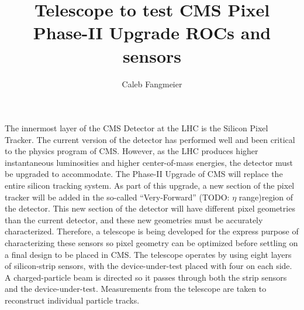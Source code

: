 \documentclass[final]{beamer}
\title{Telescope to test CMS Pixel Phase-II Upgrade ROCs and sensors} %
\author{Caleb Fangmeier} %
\institute{Dept.\ of Physics and Astronomy, Univ.\ of Nebraska \-- Lincoln} %
\begin{document}

\setlength{\belowcaptionskip}{2ex} %
\setlength\belowdisplayshortskip{2ex} %

\begin{frame}[t] %
  \small
  The innermost layer of the CMS Detector at the LHC is the Silicon Pixel Tracker. The current version of the detector has performed well and been critical to the physics program of CMS\@.  However, as the LHC produces higher instantaneous luminosities and higher center-of-mass energies, the detector must be upgraded to accommodate. The Phase-II Upgrade of CMS will replace the entire silicon tracking system.  As part of this upgrade, a new section of the pixel tracker will be added in the so-called ``Very-Forward'' (TODO: $\eta$ range)region of the detector.  This new section of the detector will have different pixel geometries than the current detector, and these new geometries must be accurately characterized.  Therefore, a telescope is being developed for the express purpose of characterizing these sensors so pixel geometry can be optimized before settling on a final design to be placed in CMS\@. The telescope operates by using eight layers of silicon-strip sensors, with the device-under-test placed with four on each side. A charged-particle beam is directed so it passes through both the strip sensors and the device-under-test. Measurements from the telescope are taken to reconstruct individual particle tracks.



\end{frame}
\end{document}

